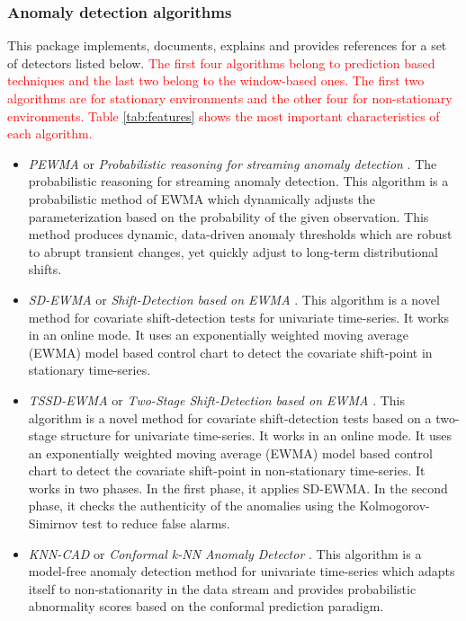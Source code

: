 \documentclass[a4paper]{article}\usepackage[]{graphicx}\usepackage[]{color}
\begin{document}
\subsubsection{Anomaly detection algorithms} \label{S:3.1.1}

This package implements, documents, explains and provides references for a set of detectors listed below.  \textcolor{red}{The first four algorithms belong to prediction based techniques and the last two belong to the window-based ones. The first two algorithms are for stationary environments and the other four for non-stationary environments. Table \ref{tab:features} shows the most important characteristics of each algorithm.}

\begin{itemize}

\item \emph{PEWMA} or \emph{Probabilistic reasoning for streaming anomaly detection} \cite{pewma}. The probabilistic reasoning for streaming anomaly detection. This algorithm is a probabilistic method of EWMA which dynamically adjusts the parameterization based on the probability of the given observation. This method produces dynamic, data-driven anomaly thresholds which are robust to abrupt transient changes, yet quickly adjust to long-term distributional shifts.

\item \emph{SD-EWMA} or \emph{Shift-Detection based on EWMA} \cite{Raza}. This algorithm is a novel method for covariate shift-detection tests for univariate time-series. It works in an online mode. It uses an exponentially weighted moving average (EWMA) model based control chart to detect the covariate shift-point in stationary time-series.

\item \emph{TSSD-EWMA} or \emph{Two-Stage Shift-Detection based on EWMA} \cite{Raza}. This algorithm is a novel method for covariate shift-detection tests based on a two-stage structure for univariate time-series. It works in an online mode. It uses an exponentially weighted moving average (EWMA) model based control chart to detect the covariate shift-point in non-stationary time-series. It works in two phases. In the first phase, it applies SD-EWMA. In the second phase, it checks the authenticity of the anomalies using the Kolmogorov-Simirnov test to reduce false alarms.

\item \emph{KNN-CAD} or \emph{Conformal k-NN Anomaly Detector} \cite{2016arXiv160804585B}. This algorithm is a model-free anomaly detection method for univariate time-series which adapts itself to non-stationarity in the data stream and provides probabilistic abnormality scores based on the conformal prediction paradigm.


\end{itemize}
\end{document}

